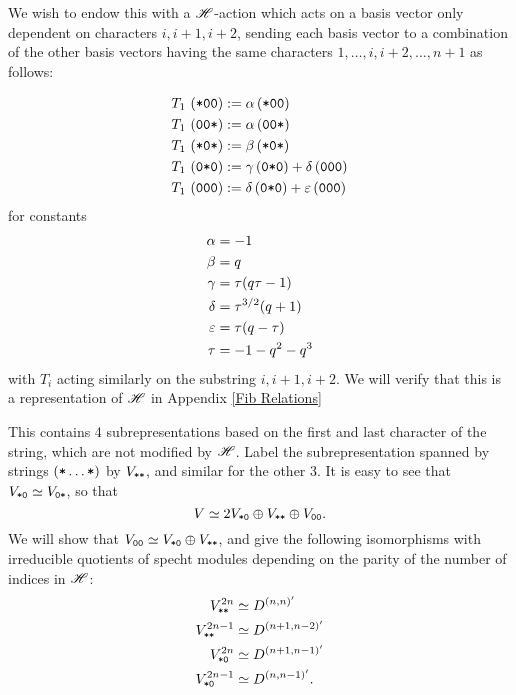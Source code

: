 \documentclass{amsart}
\begin{document}
We wish to endow this with a $\mathscr{H}$-action which acts on a basis vector only dependent on characters $i,i+1,i+2$, sending each basis vector to a combination of the other basis vectors having the same characters $1,\dots,i,i+2,\dots,n+1$ as follows:

\begin{equation} 
  \begin{split}
    T_1 \, \left( \texttt{*}\texttt{0}\texttt{0} \right) &:= \alpha\left( \texttt{*}\texttt{0}\texttt{0} \right)\\
    T_1 \, \left( \texttt{0}\texttt{0}\texttt{*} \right) &:= \alpha\left( \texttt{0}\texttt{0}\texttt{*} \right)\\
    T_1 \, \left( \texttt{*}\texttt{0}\texttt{*} \right) &:= \beta\left( \texttt{*}\texttt{0}\texttt{*} \right)\\
    T_1 \, \left( \texttt{0}\texttt{*}\texttt{0} \right) &:= \gamma\left( \texttt{0}\texttt{*}\texttt{0} \right) + \delta\left( \texttt{0}\texttt{0}\texttt{0} \right)\\
    T_1 \, \left( \texttt{0}\texttt{0}\texttt{0} \right) &:= \delta\left( \texttt{0}\texttt{*}\texttt{0} \right) + \varepsilon\left( \texttt{0}\texttt{0}\texttt{0} \right)
\end{split} \label{Fib Action} 
\end{equation}
for constants
\begin{equation}
  \begin{split}
  \alpha &= -1\\
  \beta &= q\\
  \gamma &= \tau(q\tau - 1)\\
  \delta &= \tau^{3/2}(q + 1)\\
  \varepsilon &= \tau(q-\tau)\\
  \tau &= -1-q^2-q^3
\end{split} \label{Fib Constants} 
\end{equation}
with $T_i$ acting similarly on the substring $i,i+1,i+2$.
We will verify that this is a representation of $\mathscr{H}$ in Appendix \ref{Fib Relations}

This contains 4 subrepresentations based on the first and last character of the string, which are not modified by $\mathscr{H}$.
Label the subrepresentation spanned by strings $(\texttt{*}\dots\texttt{*})$ by $V_{\texttt{*}\texttt{*}}$, and similar for the other 3.
It is easy to see that $V_{\texttt{*}\texttt{0}} \simeq V_{\texttt{0}\texttt{*}}$, so that
\[
  V \simeq 2V_{\texttt{*}\texttt{0}} \oplus V_{\texttt{*}\texttt{*}} \oplus V_{\texttt{0}\texttt{0}}.
\]
We will show that $V_{\texttt{0}\texttt{0}} \simeq V_{\texttt{*}\texttt{0}} \oplus V_{\texttt{*}\texttt{*}}$, and give the following isomorphisms with irreducible quotients of specht modules depending on the parity of the number of indices in $\mathscr{H}$:
\begin{equation}
  \begin{split}    
    V^{2n}_{\texttt{*}\texttt{*}} &\simeq D^{(n,n)'}\\ 
    V^{2n-1}_{\texttt{*}\texttt{*}} &\simeq D^{(n+1,n-2)'}\\
    V^{2n}_{\texttt{*}\texttt{0}} &\simeq D^{(n+1,n-1)'}\\
    V^{2n-1}_{\texttt{*}\texttt{0}} &\simeq D^{(n,n-1)'}.
  \end{split} \label{Fib Isos}
\end{equation}
 
\end{document}
